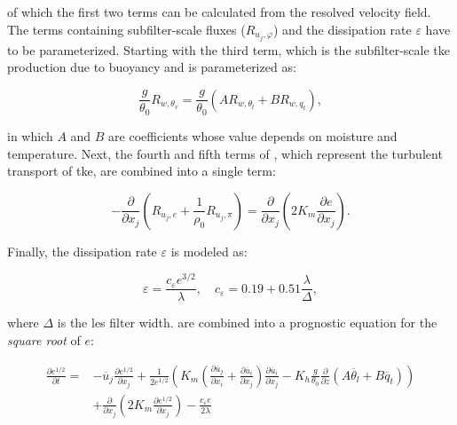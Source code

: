 of which the first two terms can be calculated from the resolved velocity field. The terms containing subfilter-scale fluxes ($R_{u_j,\varphi}$) and the dissipation rate $\varepsilon$ have to be parameterized. Starting with the third term, which is the subfilter-scale \acrshort{tke} production due to buoyancy and is parameterized as:

\begin{equation}
    \frac{g}{\theta_0} R_{w,\theta_v} = \frac{g}{\theta_0} \left( A R_{w,\theta_l} + B R_{w,q_t}\right),
    \label{eq:sfs_buoy}
\end{equation}

in which $A$ and $B$ are coefficients whose value depends on moisture and temperature. Next, the fourth and fifth terms of , which represent the turbulent transport of \acrshort{tke}, are combined into a single term:

\begin{equation}
    - \frac{\partial}{\partial x_j} \left( R_{u_j,e} + \frac{1}{\rho_0} R_{u_j,\pi} \right) = \frac{\partial}{\partial x_j} \left( 2 K_m \frac{\partial e}{\partial x_j} \right).
    \label{eq:sfs_turb}
\end{equation}

Finally, the dissipation rate $\varepsilon$ is modeled as:

\begin{equation}
    \varepsilon = \frac{c_{\varepsilon}e^{3/2}}{\lambda}, \quad c_\varepsilon = 0.19 + 0.51 \frac{\lambda}{\Delta},
    \label{eq:sfs_diss}
\end{equation}

where $\Delta$ is the \acrshort{les} filter width.  are combined into a prognostic equation for the \emph{square root} of $e$:

\begin{equation}
    \begin{split}
        \frac{\partial e^{1/2}}{\partial t} = &- \overline{u}_j \frac{\partial e^{1/2}}{\partial x_j} + \frac{1}{2e^{1/2}} \left( K_m \left( \frac{\partial \overline{u}_j}{\partial x_i} + \frac{\partial \overline{u}_i}{\partial x_j} \right) \frac{\partial \overline{u}_i}{\partial x_j} - K_h \frac{g}{\theta_0} \frac{\partial}{\partial z} \left( A \overline{\theta}_l + B \overline{q}_t\right) \right) \\ &+ \frac{\partial}{\partial x_j} \left( 2 K_m \frac{\partial e^{1/2}}{\partial x_j}\right) - \frac{c_{\varepsilon} e}{2 \lambda}
    \end{split}
    \end{equation}

